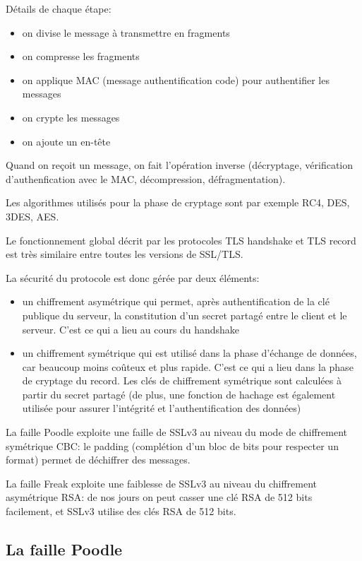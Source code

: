 Détails de chaque étape:
\begin{itemize}
\item on divise le message à transmettre en fragments 
\item on compresse les fragments
\item on applique MAC (message authentification code) pour authentifier les messages 
\item on crypte les messages
\item on ajoute un en-t\^ete
\end{itemize}
Quand on reçoit un message, on fait l'opération inverse (décryptage, vérification d'authenfication avec le MAC, décompression, défragmentation). 

Les algorithmes utilisés pour la phase de cryptage sont par exemple RC4, DES, 3DES, AES. 

Le fonctionnement global décrit par les protocoles TLS handshake et TLS record est très similaire entre toutes les versions de SSL/TLS. 


La sécurité du protocole est donc gérée par deux éléments:
\begin{itemize}
\item un chiffrement asymétrique qui permet, après authentification de la clé publique du serveur, la constitution d'un secret partagé entre le client et le serveur. C'est ce qui a lieu au cours du handshake
\item un chiffrement symétrique qui est utilisé dans la phase d'échange de données, car beaucoup moins coûteux et plus rapide. C'est ce qui a lieu dans la phase de cryptage du record. Les clés de chiffrement symétrique sont calculées à partir du secret partagé (de plus, une fonction de hachage est également utilisée pour assurer l'intégrité et l'authentification des données)
\end{itemize}

La faille Poodle exploite une faille de SSLv3 au niveau du mode de chiffrement symétrique CBC: le padding (complétion d'un bloc de bits pour respecter un format) permet de déchiffrer des messages. 


La faille Freak exploite une faiblesse de SSLv3 au niveau du chiffrement asymétrique RSA: de nos jours on peut casser une clé RSA de 512 bits facilement, et SSLv3 utilise des clés RSA de 512 bits.

\subsection{La faille Poodle}

